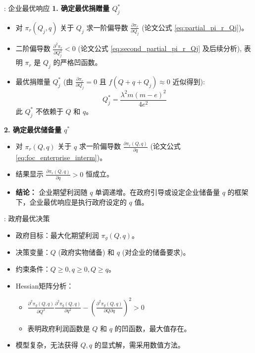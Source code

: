 \documentclass[9pt]{beamer}
\begin{document}
\begin{frame}{\insertsectionhead: 企业最优响应}
    \textbf{1. 确定最优捐赠量 $Q_j^*$}
    \begin{itemize}
        \item 对 $\pi_r(Q_j,q)$ 关于 $Q_j$ 求一阶偏导数 $\frac{\partial{\pi}_r}{\partial Q_j}$ (论文公式 \ref{eq:partial_pi_r_Qj})。
        \item 二阶偏导数 $\frac{\partial^2 {\pi}_r}{\partial Q_j^2} < 0$ (论文公式 \ref{eq:second_partial_pi_r_Qj} 及后续分析), 表明 $\pi_r$ 是 $Q_j$ 的严格凹函数。
        \item 最优捐赠量 $Q_j^*$ (由 $\frac{\partial{\pi}_r}{\partial Q_j}=0$ 且 $f(Q+q+Q_j) \approx 0$ 近似得到):
        \begin{equation} \label{eq:beamer_optimal_Qj}
        Q_j^* = \frac{\lambda^2 m (m-e)^2}{4e^2}
        \end{equation}
        此 $Q_j^*$ 不依赖于 $Q$ 和 $q$。
    \end{itemize}
    \vspace{0.5em}
    \textbf{2. 确定最优储备量 $q^*$}
    \begin{itemize}
        \item 对 $\pi_r(Q,q)$ 关于 $q$ 求一阶偏导数 $\frac{\partial \pi_r(Q,q)}{\partial q}$ (论文公式 \ref{eq:foc_enterprise_interm})。
        \item 结果显示 $\frac{\partial \pi_r(Q,q)}{\partial q} > 0$ 恒成立。
        \item \textbf{结论：} 企业期望利润随 $q$ 单调递增。在政府引导或设定企业储备量 $q$ 的框架下，企业最优响应是执行政府设定的 $q$ 值。
    \end{itemize}
\end{frame}

\begin{frame}{\insertsectionhead: 政府最优决策}
    \begin{itemize}
        \item 政府目标：最大化期望利润 $\pi_g(Q,q)$。
        \item 决策变量：$Q$ (政府实物储备) 和 $q$ (对企业的储备要求)。
        \item 约束条件：$Q \ge 0, q \ge 0, Q \ge q$。
        \item Hessian矩阵分析：
            \begin{itemize}
                \item $\frac{\partial^2 \pi_g(Q,q)}{\partial Q^2} \frac{\partial^2 \pi_g(Q,q)}{\partial q^2} - \left(\frac{\partial^2 \pi_g(Q,q)}{\partial Q\partial q}\right)^2 > 0$
                \item 表明政府利润函数是 $Q$ 和 $q$ 的凹函数，最大值存在。
            \end{itemize}
        \item 模型复杂，无法获得 $Q, q$ 的显式解，需采用数值方法。
    \end{itemize}
\end{frame}
\end{document}
